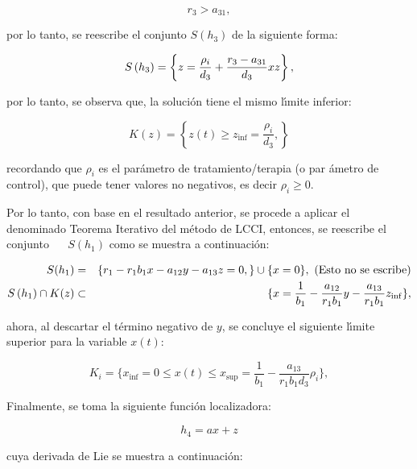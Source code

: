 \documentclass[letterpaper,11pt]{article}
\begin{document}
\begin{equation*}
r_{3}>a_{31},
\end{equation*}

por lo tanto, se reescribe el conjunto $S\left( h_{3}\right) $ de la
siguiente forma:

\begin{equation*}
S\left( h_{3}\right) =\left\{ z=\frac{\rho _{i}}{d_{3}}+\frac{r_{3}-a_{31}}{%
d_{3}}xz\right\} ,
\end{equation*}

por lo tanto, se observa que, la soluci\'{o}n tiene el mismo l\'{\i}mite
inferior:

\begin{equation*}
K(z)=\left\{ z\left( t\right) \geq z_{\inf }=\frac{\rho _{i}}{d_{3}},\right\}
\end{equation*}

recordando que $\rho _{i}$ es el par\'{a}metro de tratamiento/terapia (o par%
\'{a}metro de control), que puede tener valores no negativos, es decir $\rho
_{i}\geq 0.$

Por lo tanto, con base en el resultado anterior, se procede a aplicar el
denominado Teorema Iterativo del m\'{e}todo de LCCI, entonces, se reescribe
el conjunto $\ \ \ \ \ \ S(h_{1})$ como se muestra a continuaci\'{o}n:

\begin{eqnarray*}
S(h_{1}) &=&\{r_{1}-r_{1}b_{1}x-a_{12}y-a_{13}z=0,\}\cup \{x=0\},\text{
(Esto no se escribe)} \\
S\left( h_{1}\right) \cap K(z) &\subset &\{x=\frac{1}{b_{1}}-\frac{a_{12}}{%
r_{1}b_{1}}y-\frac{a_{13}}{r_{1}b_{1}}z_{\inf }\},
\end{eqnarray*}

\bigskip

ahora, al descartar el t\'{e}rmino negativo de $y$, se concluye el siguiente
l\'{\i}mite superior para la variable $x\left( t\right) $:

\begin{equation*}
K_{i}=\{x_{\inf }=0\leq x\left( t\right) \leq x_{\sup }=\frac{1}{b_{1}}-%
\frac{a_{13}}{r_{1}b_{1}d_{3}}\rho _{i}\},
\end{equation*}

Finalmente, se toma la siguiente funci\'{o}n localizadora:

\begin{equation*}
h_{4}=ax+z
\end{equation*}

cuya derivada de Lie se muestra a continuaci\'{o}n:
\end{document}
